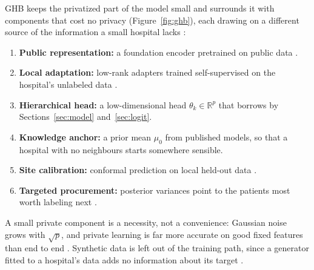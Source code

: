 \documentclass[acmsmall,screen,review]{acmart}
\theoremstyle{acmdefinition}
\begin{document}
GHB keeps the privatized part of the model small and surrounds it with components that cost no privacy (Figure~\ref{fig:ghb}), each drawing on a different source of the information a small hospital lacks \cite{simoes2026collectively}:
\begin{enumerate}[label=\textbf{L\arabic*},start=0,leftmargin=*,itemsep=1pt]
\item \textbf{Public representation:} a foundation encoder pretrained on public data \cite{moor2023foundation,rasmy2021med,zhou2023foundation}.
\item \textbf{Local adaptation:} low-rank adapters \cite{hu2022lora} trained self-supervised on the hospital's unlabeled data \cite{chen2020simple,he2022masked}.
\item \textbf{Hierarchical head:} a low-dimensional head $\theta_k\in\mathbb{R}^p$ that borrows by Sections~\ref{sec:model} and~\ref{sec:logit}.
\item \textbf{Knowledge anchor:} a prior mean $\mu_0$ from published models, so that a hospital with no neighbours starts somewhere sensible.
\item \textbf{Site calibration:} conformal prediction on local held-out data \cite{angelopoulos2023conformal,lu2023federated,shafer2008tutorial}.
\item \textbf{Targeted procurement:} posterior variances point to the patients most worth labeling next \cite{settles2009active}.
\end{enumerate}
A small private component is a necessity, not a convenience: Gaussian noise grows with $\sqrt{p}$, and private learning is far more accurate on good fixed features than end to end \cite{tramer2021differentially}. Synthetic data is left out of the training path, since a generator fitted to a hospital's data adds no information about its target \cite{simoes2026collectively,stadler2022synthetic}.
\end{document}
